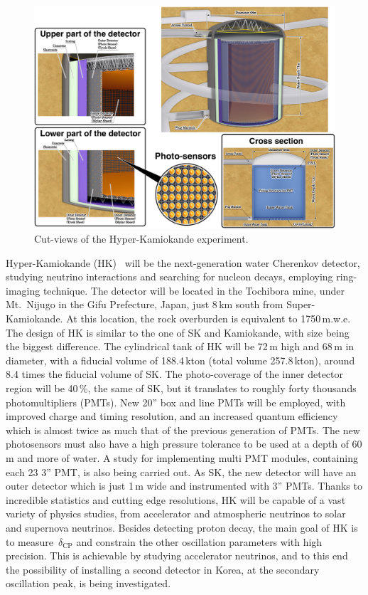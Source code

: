 \begin{figure}
	\centering
	\includegraphics[width=0.8\linewidth]{pics/hkonlytank.png}
	\caption[Views of the Hyper-Kamiokande experiment]{Cut-views of the Hyper-Kamiokande experiment.}
	\label{fig:hkdr}
\end{figure}

Hyper-Kamiokande (HK)~\cite{Abe:2018uyc} will be the next-generation water Cherenkov detector, %
studying neutrino interactions and searching for nucleon decays, employing ring-imaging technique.
The detector will be located in the Tochibora mine, under Mt.\ Nijugo in the Gifu Prefecture, Japan, 
just 8\,km south from Super-Kamiokande.
At this location, the rock overburden is equivalent to 1750\,m.w.e.
The design of HK is similar to the one of SK and Kamiokande, with size being the biggest difference.
The cylindrical tank of HK will be 72\,m high and 68\,m in diameter, with a fiducial volume of 188.4\,kton (total volume 257.8\,kton), %
around 8.4 times the fiducial volume of SK.
The photo-coverage of the inner detector region will be 40\,\%, the same of SK, %
but it translates to roughly forty thousands photomultipliers (PMTs).
New 20'' box and line PMTs will be employed, with improved charge and timing resolution, %
and an increased quantum efficiency which is almost twice as much that of the previous generation of PMTs.
The new photosensors must also have a high pressure tolerance to be used at a depth of 60\,m and more of water.
A study for implementing multi PMT modules, containing each 23 3'' PMT, is also being carried out.
As SK, the new detector will have an outer detector which is just 1\,m wide and instrumented with 3'' PMTs.
Thanks to incredible statistics and cutting edge resolutions, HK will be capable of a vast variety of physics studies, %
from accelerator and atmospheric neutrinos to solar and supernova neutrinos.
Besides detecting proton decay, the main goal of HK is to measure~$\delta_\text{CP}$ and constrain the other oscillation parameters %
with high precision.
This is achievable by studying accelerator neutrinos, and to this end the possibility of installing a second detector in Korea, %
at the secondary oscillation peak, is being investigated.

